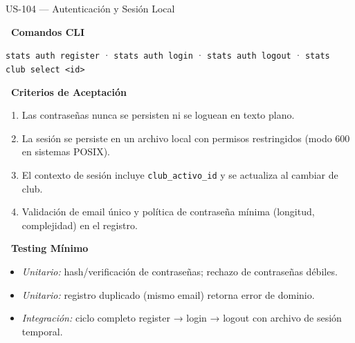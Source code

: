 \documentclass[11pt,a4paper]{article}
\newcommand{\fpath}[1]{\texttt{\small #1}}
\newcommand{\usfield}[2][\;]{%
  \par\vspace{5pt}%
  {\small\textbf{\textcolor{primary}{#2}}}\par\vspace{2pt}%
}
\begin{document}
\begin{uscard}{US-104 — Autenticación y Sesión Local}
\usfield{\faTerminal\ Comandos CLI}
\fpath{stats auth register} · \fpath{stats auth login} · \fpath{stats auth logout} · \fpath{stats club select <id>}

\usfield{\faCheckCircle\ Criterios de Aceptación}
\begin{enumerate}[label=\textcolor{accent}{\textbf{AC\arabic*.}}, nosep, leftmargin=2.2em]
  \item Las contraseñas nunca se persisten ni se loguean en texto plano.
  \item La sesión se persiste en un archivo local con permisos restringidos (modo 600 en sistemas POSIX).
  \item El contexto de sesión incluye \fpath{club\_activo\_id} y se actualiza al cambiar de club.
  \item Validación de email único y política de contraseña mínima (longitud, complejidad) en el registro.
\end{enumerate}

\usfield{\faFlask\ Testing Mínimo}
\begin{itemize}[nosep, leftmargin=1.6em]
  \item \textit{Unitario:} hash/verificación de contraseñas; rechazo de contraseñas débiles.
  \item \textit{Unitario:} registro duplicado (mismo email) retorna error de dominio.
  \item \textit{Integración:} ciclo completo register → login → logout con archivo de sesión temporal.
\end{itemize}

\end{uscard}
\end{document}
